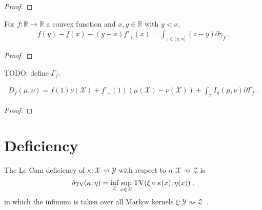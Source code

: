 \begin{proof}%
\uses{}

\end{proof}

\begin{lemma}
  \label{lem:convex_taylor_lt}
  For $f: \mathbb{R} \to \mathbb{R}$ a convex function and $x,y \in \mathbb{R}$ with $y < x$,
  \begin{align*}
  f(y) - f(x) - (y - x)f'_+(x) = \int_{z \in (y,x]} (z - y) \partial \gamma_f \: .
  \end{align*}
\end{lemma}

\begin{proof}%
\uses{}

\end{proof}

TODO: define $\Gamma_f$.

\begin{theorem}
  \label{thm:fDiv_eq_integral}
  \begin{align*}
  D_f(\mu, \nu) = f(1) \nu(\mathcal X) + f'_+(1)(\mu(\mathcal X) - \nu(\mathcal X)) + \int_\pi I_\pi(\mu, \nu) \partial\Gamma_f \: .
  \end{align*}
  
\end{theorem}

\begin{proof}%
\uses{}

\end{proof}

\section{Deficiency}

\begin{definition}
  \label{def:deficiency}
  The Le Cam deficiency of $\kappa : \mathcal X \rightsquigarrow \mathcal Y$ with respect to $\eta : \mathcal X \rightsquigarrow \mathcal Z$ is
  \begin{align*}
  \delta_{\operatorname{TV}}(\kappa, \eta) = \inf_{\xi} \sup_{x \in \mathcal X} \operatorname{TV}(\xi \circ \kappa (x), \eta(x)) \: ,
  \end{align*}
  in which the infimum is taken over all Markov kernels $\xi : \mathcal Y \rightsquigarrow \mathcal Z$~.
\end{definition}

